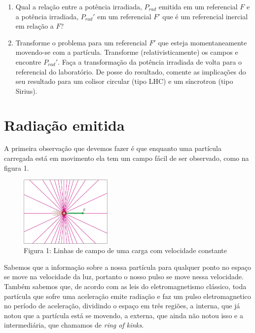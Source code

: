 \documentclass[12pt, letterpaper]{article}
\begin{document}
\begin{enumerate}
    \begin{enumerate}
        \item Qual a relação entre a potência irradiada, $P_{rad}$ emitida em um referencial $F$ e a potência irradiada, $P_{rad}'$ em um referencial $F'$ que é um referencial inercial em relação a $F$?
        \item Transforme o problema para um referencial $F'$ que esteja momentaneamente movendo-se com a partícula. Transforme (relativisticamente) os campos e encontre $P_{rad}'$. Faça a transformação da potência irradiada de volta para o referencial do laboratório. De posse do resultado, comente as implicações do seu resultado para um colisor circular (tipo LHC) e um síncrotron (tipo Sirius).
    \end{enumerate}
    \end{enumerate}

\newpage
\section{Radiação emitida}
    \par
    A primeira observação que devemos fazer é que enquanto uma partícula carregada está em movimento ela tem um campo fácil de ser observado, como na figura 1.
    
    \begin{figure}[h]
        \centering
        \includegraphics[width=0.4\textwidth]{moving particle}
        \\{Figura 1: Linhas de campo de uma carga com velocidade constante}
        \label{fig:fig1}
    \end{figure}

    Sabemos que a informação sobre a nossa partícula para qualquer ponto no espaço se move na velocidade da luz, portanto o nosso pulso se move nessa velocidade. Também sabemos que, de acordo com as leis do eletromagnetismo clássico, toda partícula que sofre uma aceleração emite radiação e faz um pulso eletromagnetico no período de aceleração, dividindo o espaço em três regiões, a interna, que já notou que a partícula está se movendo, a externa, que ainda não notou isso e a intermediária, que chamamos de \textit{ring of kinks}.
\end{document}
